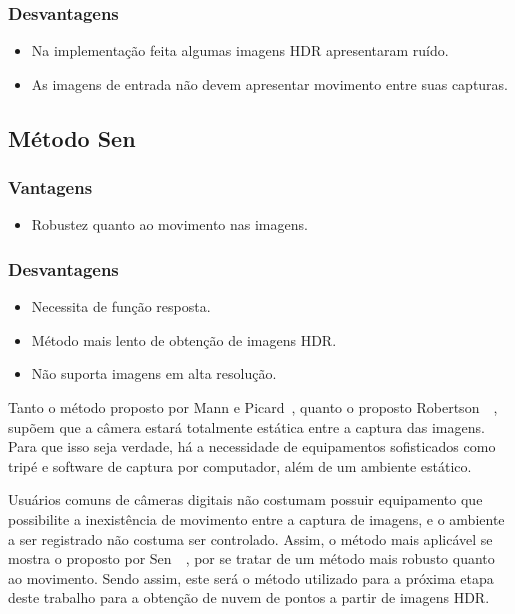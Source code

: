 \subsubsection{Desvantagens}
\begin{itemize}
	\item Na implementação feita algumas imagens HDR apresentaram ruído.
	\item As imagens de entrada não devem apresentar movimento entre suas capturas.
\end{itemize}

\subsection{Método Sen} \label{discussaoSen}
\subsubsection{Vantagens}
\begin{itemize}
	\item Robustez quanto ao movimento nas imagens.
\end{itemize}
\subsubsection{Desvantagens}
\begin{itemize}
	\item Necessita de função resposta.
	\item Método mais lento de obtenção de imagens HDR.
	\item Não suporta imagens em alta resolução.
\end{itemize}

Tanto o método proposto por Mann e Picard~\cite{mann}, quanto o proposto Robertson~\etal~\cite{robertson}, supõem que a câmera estará totalmente estática entre a captura das imagens. Para que isso seja verdade, há a necessidade de equipamentos sofisticados como tripé e software de captura por computador, além de um ambiente estático. 

Usuários comuns de câmeras digitais não costumam possuir equipamento que possibilite a inexistência de movimento entre a captura de imagens, e o ambiente a ser registrado não costuma ser controlado. Assim, o método mais aplicável se mostra o proposto por Sen~\etal~\cite{hdrMovimento}, por se tratar de um método mais robusto quanto ao movimento. Sendo assim, este será o método utilizado para a próxima etapa deste trabalho para a obtenção de nuvem de pontos a partir de imagens HDR.
